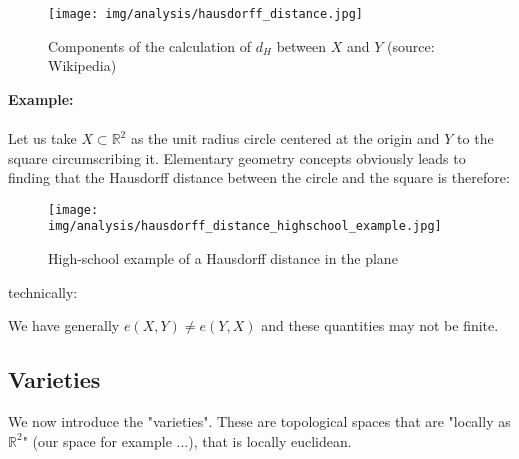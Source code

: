 	\begin{figure}[H]
		\centering
		\texttt{[image: img/analysis/hausdorff\_distance.jpg]}
		\caption[]{Components of the calculation of $d_H$ between $X$ and $Y$ (source: Wikipedia)}
	\end{figure}
	\begin{tcolorbox}[colframe=black,colback=white,sharp corners]
	\textbf{{\Large {}}Example:}\\\\
	Let us take $X\subset \mathbb{R}^2$ as the unit radius circle centered at the origin and $Y$ to the square circumscribing it. Elementary geometry concepts obviously leads to finding that the Hausdorff distance between the circle and the square is therefore:
	\begin{figure}[H]
		\centering
		\texttt{[image: img/analysis/hausdorff\_distance\_highschool\_example.jpg]}
		\caption{High-school example of a Hausdorff distance in the plane}
	\end{figure}
	technically:
	
	\end{tcolorbox}
	\begin{tcolorbox}[title=Remark,colframe=black,arc=10pt]
	We have generally $e(X,Y)\neq e(Y,X)$ and these quantities may not be finite.
	\end{tcolorbox}
	
	\subsection{Varieties}\label{varieties}
	We now introduce the "varieties". These are topological spaces that are "locally as $\mathbb{R}^2$" (our space for example ...), that is locally euclidean.
	
